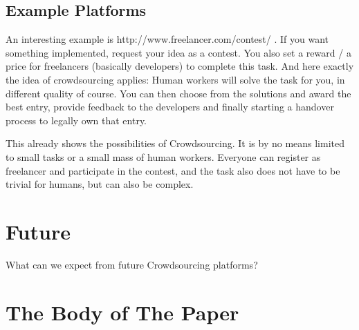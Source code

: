 \documentclass{sig-alternate}
\begin{document}
\subsection{Example Platforms}

An interesting example is http://www.freelancer.com/contest/ .
If you want something implemented, request your idea as a contest. You also set a reward / a price for freelancers (basically developers) to complete this task.
And here exactly the idea of crowdsourcing applies: Human workers will solve the task for you, in different quality of course. You can then choose
from the solutions and award the best entry, provide feedback to the developers and finally starting a handover process to legally own that entry.

This already shows the possibilities of Crowdsourcing. It is by no means limited to small tasks or a small mass of human workers.
Everyone can register as freelancer and participate in the contest, and the task also does not have to be trivial for humans, but can also be complex.



\section{Future}

What can we expect from future Crowdsourcing platforms?






\section{The {\secit Body} of The Paper}

%

\end{document}

